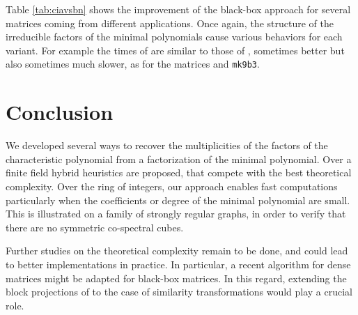 \documentclass{article}
\begin{document}
Table \ref{tab:ciavsbn} shows the improvement of the black-box approach for
several matrices coming from
different applications. Once again, the structure of the irreducible factors of
the minimal polynomials cause various behaviors for each variant. For example
the times of \dlogsys\xspace are similar to those of 
\nullcomb, sometimes better but also sometimes much slower, as
for the matrices  and \texttt{mk9b3}.

\section{Conclusion}
We developed several ways to recover the multiplicities of the factors of the 
characteristic polynomial  from a factorization of the minimal
polynomial. 
Over a finite field  hybrid heuristics are proposed, that compete with
the best theoretical complexity.
Over the ring of integers, our approach enables fast
computations particularly when the coefficients or degree of the minimal
polynomial are small.
This is illustrated on a family of strongly regular graphs, in order to verify
 that there are no symmetric co-spectral cubes.

Further studies on the theoretical complexity remain to be done, and could lead
to better implementations in practice. In particular, a recent algorithm for
dense matrices \cite{Pernet:2007:charp} might be adapted for black-box
matrices. 
In this regard, extending the block projections of
\cite{EGGSV:2007:BBinv} to the case of similarity transformations would play a
crucial role.
\end{document}
